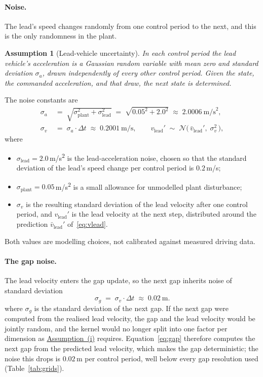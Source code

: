 \documentclass[11pt,a4paper]{article}
\newcommand{\Norm}{\mathcal{N}}
\newcommand{\dt}{\Delta t}
\newcommand{\vlead}{v_{\text{lead}}}
\newcommand{\sigmav}{\sigma_{v}}
\newcommand{\sigmaa}{\sigma_{a}}
\theoremstyle{plain}
\newtheorem{assumption}{Assumption}
\theoremstyle{remark}
\begin{document}
	\paragraph{Noise.}
	The lead's speed changes randomly from one control period to the next, and this is the only randomness in the plant.
	\begin{assumption}[Lead-vehicle uncertainty]
		\label{ass:lead}
		In each control period the lead vehicle's acceleration is a Gaussian random variable with mean zero and standard deviation $\sigmaa$, drawn independently of every other control period. Given the state, the commanded acceleration, and that draw, the next state is determined.
	\end{assumption}
	The noise constants are
	\begin{align}
		\sigmaa &\;=\; \sqrt{\sigma_{\text{plant}}^2 + \sigma_{\text{lead}}^2} \;=\; \sqrt{0.05^2 + 2.0^2} \;\approx\; 2.0006\ \text{m/s}^2, \label{eq:sigmaa}\\
		\sigmav &\;=\; \sigmaa \cdot \dt \;\approx\; 0.2001\ \text{m/s}, \qquad
		\vlead' \;\sim\; \Norm\bigl(\,\bar{v}_{\text{lead}}',\; \sigmav^2\,\bigr), \label{eq:sigmav}
	\end{align}
	where
	\begin{itemize}
		\item $\sigma_{\text{lead}} = 2.0$\,m/s\textsuperscript{2} is the lead-acceleration noise, chosen so that the standard deviation of the lead's speed change per control period is $0.2$\,m/s;
		\item $\sigma_{\text{plant}} = 0.05$\,m/s\textsuperscript{2} is a small allowance for unmodelled plant disturbance;
		\item $\sigmav$ is the resulting standard deviation of the lead velocity after one control period, and $\vlead'$ is the lead velocity at the next step, distributed around the prediction $\bar{v}_{\text{lead}}'$ of~\eqref{eq:vlead}.
	\end{itemize}
	Both values are modelling choices, not calibrated against measured driving data.
	
	\paragraph{The gap noise.}
	The lead velocity enters the gap update, so the next gap inherits noise of standard deviation
	\begin{equation}
		\sigma_g \;=\; \sigmav \cdot \dt \;\approx\; 0.02\ \text{m}.
		\label{eq:gapnoise}
	\end{equation}
	where $\sigma_g$ is the standard deviation of the next gap. If the next gap were computed from the realised lead velocity, the gap and the lead velocity would be jointly random, and the kernel would no longer split into one factor per dimension as \hyperref[ass:sysclass]{Assumption~(i)} requires. Equation~\eqref{eq:gap} therefore computes the next gap from the predicted lead velocity, which makes the gap deterministic; the noise this drops is $0.02$\,m per control period, well below every gap resolution used (Table~\ref{tab:grids}).
	
\end{document}
